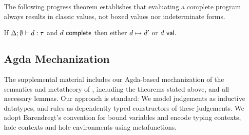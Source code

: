 The following progress theorem establishes that evaluating a complete
program always results in classic values, not boxed values nor
indeterminate forms.
%
\begin{thm}
  If $\Delta; \emptyset \vdash d : \tau$
  and $d~\mathsf{complete}$
  then either $d \mapsto d'$
  or $d~\mathsf{val}$.
\end{thm}





\subsection{Agda Mechanization}
\label{sec:agda-mechanization}
\vspace{-3px}

The supplemental material includes our Agda-based
mechanization  \cite{norell2009dependently,norell:thesis} 
of the semantics and metatheory of \HazelnutLive, 
including the theorems stated above, and all necessary lemmas. 
%
%
%
%
%
Our approach is standard: We model judgements as 
inductive datatypes, and rules as dependently typed constructors of these judgements. 
%
We adopt Barendregt's convention for bound variables \cite{urban,barendregt84:_lambda_calculus} and encode typing 
contexts, hole contexts and hole environments using metafunctions.

